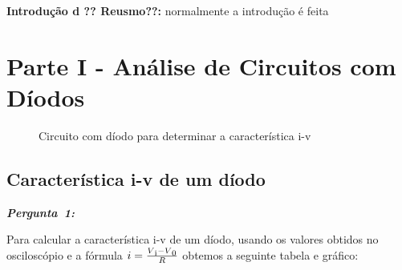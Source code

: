 \documentclass[pdftex,12pt,a4paper]{report}
\begin{document}
 

\renewcommand{\headrulewidth}{0pt}

\vspace*{\fill}
\textbf{Introdução  d  ?? Reusmo??:}
\begingroup
normalmente a introdução é feita 
\endgroup
\vspace*{\fill}
\newpage

\renewcommand*\contentsname{Conteúdos}
\renewcommand*\figurename{Figura}

\tableofcontents
\renewcommand{\headrulewidth}{0.15pt}
\renewcommand{\thechapter}{}

\clearpage

\section{Parte I - Análise de Circuitos com Díodos}
\begin{figure}[h]
\centerline{}
\caption{Circuito com díodo para determinar a característica i-v}\label{diodo_parte1}
\end{figure}

\subsection{Característica i-v de um díodo} 
\hbox{\emph{\textbf{Pergunta 1:}}\newline\newline}

Para calcular a característica i-v de um díodo, usando os valores obtidos no osciloscópio e a fórmula $i = \frac{V\textsubscript{i}-V\textsubscript{0}}{R}$ obtemos a seguinte tabela e gráfico:\newline

\endminipage\hfill
{}
\endminipage\hfill
\end{document}
